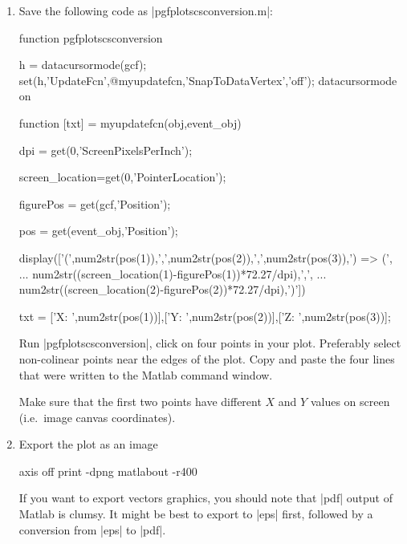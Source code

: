{{\begin{enumerate}
	\item Save the following code as |pgfplotscsconversion.m|:
\begin{codeexample}
function pgfplotscsconversion

h = datacursormode(gcf);
set(h,'UpdateFcn',@myupdatefcn,'SnapToDataVertex','off');
datacursormode on


function [txt] = myupdatefcn(obj,event_obj)

dpi = get(0,'ScreenPixelsPerInch');

screen_location=get(0,'PointerLocation');

figurePos = get(gcf,'Position');

pos = get(event_obj,'Position');

display(['(',num2str(pos(1)),',',num2str(pos(2)),',',num2str(pos(3)),') => (', ...
   num2str((screen_location(1)-figurePos(1))*72.27/dpi),',', ...
   num2str((screen_location(2)-figurePos(2))*72.27/dpi),')'])

txt = {['X: ',num2str(pos(1))],['Y: ',num2str(pos(2))],['Z: ',num2str(pos(3))]};
\end{codeexample}
	
	Run |pgfplotscsconversion|, click on four points in your plot. Preferably select non-colinear points near the edges of the plot. Copy and paste the four lines that were written to the Matlab command window.

	Make sure that the first two points have different $X$ and $Y$ values on screen (i.e.\ image canvas coordinates).
	\item Export the plot as an image
\begin{codeexample}
axis off
print -dpng matlabout -r400 %
\end{codeexample}

If you want to export vectors graphics, you should note that |pdf| output of Matlab is clumsy. It might be best to export to |eps| first, followed by a conversion from |eps| to |pdf|.


\end{enumerate}}}
